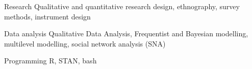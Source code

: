 
\begin{cvskills}

  \cvskill
    {Research} %
    {Qualitative and quantitative research design, ethnography, survey methods, instrument design} %

  \cvskill
    {Data analysis} %
    {Qualitative Data Analysis, Frequentist and Bayesian modelling, multilevel modelling, social network analysis (SNA)} %

  \cvskill
    {Programming} %
    {R, STAN, bash} %






\end{cvskills}
